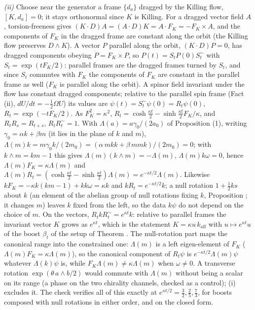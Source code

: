 \emph{(ii)} Choose near the generator a frame $\{d_{a}\}$ dragged by the Killing flow, $[K, d_{a}] = 0$; it stays orthonormal since $K$ is Killing. For a dragged vector field $A$, torsion-freeness gives $(K\cdot D)A = (A\cdot D)K = A\cdot F_{K} = -F_{K}\times A$, and the components of $F_{K}$ in the dragged frame are constant along the orbit (the Killing flow preserves $D\wedge K$). A vector $P$ parallel along the orbit, $(K\cdot D)P = 0$, has dragged components obeying $\dot P = F_{K}\times P$, so $P(t) = S_{t}P(0)S_{t}^{\sim}$ with $S_{t} = \exp(tF_{K}/2)$: parallel frames are the dragged frames turned by $S_{t}$, and since $S_{t}$ commutes with $F_{K}$ the components of $F_{K}$ are constant in the parallel frame as well ($F_{K}$ is parallel along the orbit). A spinor field invariant under the flow has constant dragged components; relative to the parallel spin frame (Fact (ii), $dU/dt = -\tfrac12\Omega U$) its values are $\psi(t) = S_{t}^{\sim}\psi(0) = R_{t}\psi(0)$, $R_{t} = \exp(-tF_{K}/2)$. As $F_{K}^{2} = \kappa^{2}$, $R_{t} = \cosh\tfrac{\kappa t}{2} - \sinh\tfrac{\kappa t}{2}F_{K}/\kappa$, and $R_{t}R_{s} = R_{t+s}$, $R_{t}R_{t}^{\sim} = 1$. With $\Lambda(a) = a\gamma_{0}/(2a_{0})$ of Proposition (1), writing $\gamma_{0} = \alpha k + \beta m$ (it lies in the plane of $k$ and $m$), $\Lambda(m)k = m\gamma_{0}k/(2m_{0}) = (\alpha\,mkk + \beta\,mmk)/(2m_{0}) = 0$; with $k\wedge m = km - 1$ this gives $\Lambda(m)(k\wedge m) = -\Lambda(m)$, $\Lambda(m)k\omega = 0$, hence $\Lambda(m)F_{K} = \kappa\Lambda(m)$ and $\Lambda(m)R_{t} = (\cosh\tfrac{\kappa t}{2} - \sinh\tfrac{\kappa t}{2})\Lambda(m) = e^{-\kappa t/2}\Lambda(m)$. Likewise $kF_{K} = -\kappa k(km - 1) + kk\omega = \kappa k$ and $kR_{t} = e^{-\kappa t/2}k$; a null rotation $1 + \tfrac12 ks$ about $k$ (an element of the abelian group of null rotations fixing $k$, Proposition ; it changes $m$) leaves $k$ fixed from the left, so the data $k\psi$ do not depend on the choice of $m$. On the vectors, $R_{t}kR_{t}^{\sim} = e^{\kappa t}k$: relative to parallel frames the invariant vector $K$ grows as $e^{\kappa t}$, which is the statement $K = \kappa u\,k_{\mathrm{aff}}$ with $u \mapsto e^{\kappa t}u$ of the boost $\beta_{t}$ of the setup of Theorem . The null-rotation part maps the canonical range into the constrained one: $\Lambda(m)$ is a left eigen-element of $F_{K}$ ($\Lambda(m)F_{K} = \kappa\Lambda(m)$), so the canonical component of $R_{t}\psi$ is $e^{-\kappa t/2}\Lambda(m)\psi$ whatever $\Lambda(k)\psi$ is, while $F_{K}\Lambda(m) \ne \kappa\Lambda(m)$ when $\omega \ne 0$. A transverse rotation $\exp(\theta\,a\wedge b/2)$ would commute with $\Lambda(m)$ without being a scalar on its range (a phase on the two chirality channels, checked as a control); (i) excludes it. The check verifies all of this exactly at $e^{\kappa t/2} = \tfrac32, \tfrac25, \tfrac73$, for boosts composed with null rotations in either order, and on the closed form.

